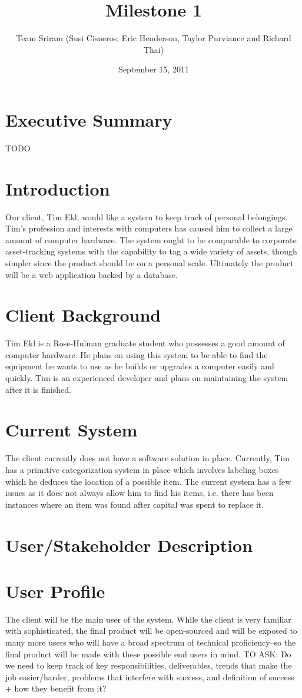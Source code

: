 \documentclass{article}
\begin{document}
\title{Milestone 1}
\author{Team Sriram (Susi Cisneros, Eric Henderson, Taylor Purviance and Richard Thai)}
\date{September 15, 2011}
\maketitle
\clearpage
\tableofcontents
\clearpage
\section{Executive Summary}
TODO\\
\section{Introduction}
Our client, Tim Ekl, would like a system to keep track of personal belongings. Tim’s profession and interests with computers has caused him to collect a large amount of computer hardware. The system ought to be comparable to corporate asset-tracking systems with the capability to tag a wide variety of assets, though simpler since the product should be on a personal scale. Ultimately the product will be a web application backed by a database.

\section{Client Background}
Tim Ekl is a Rose-Hulman graduate student who possesses a good amount of computer hardware.  He plans on using this system to be able to find the equipment he wants to use as he builds or upgrades a computer easily and quickly.  Tim is an experienced developer and plans on maintaining the system after it is finished.  

\section{Current System}
The client currently does not have a software solution in place.  Currently, Tim has a primitive categorization system in place which involves labeling boxes which he deduces the location of a possible item.  The current system has a few issues as it does not always allow him to find his items, i.e. there has been instances where an item was found after capital was spent to replace it.
\section{User/Stakeholder Description}
\section{User Profile}
The client will be the main user of the system.  While the client is very familiar with sophisticated, the final product will be open-sourced and will be exposed to many more users who will have a broad spectrum of technical proficiency--so the final product will be made with these possible end users in mind.
TO ASK: Do we need to keep track of key responsibilities, deliverables, trends that make the job easier/harder, problems that interfere with success, and definition of success + how they benefit from it?
\end{document}
